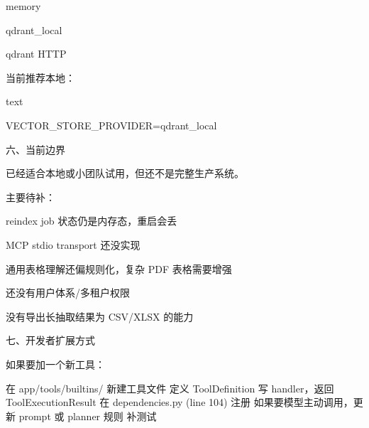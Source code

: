 memory

qdrant_local

qdrant HTTP


当前推荐本地：

text



VECTOR_STORE_PROVIDER=qdrant_local





六、当前边界

已经适合本地或小团队试用，但还不是完整生产系统。

主要待补：


reindex job 状态仍是内存态，重启会丢

MCP stdio transport 还没实现

通用表格理解还偏规则化，复杂 PDF 表格需要增强

还没有用户体系/多租户权限

没有导出长抽取结果为 CSV/XLSX 的能力


七、开发者扩展方式

如果要加一个新工具：

在 app/tools/builtins/ 新建工具文件
定义 ToolDefinition
写 handler，返回 ToolExecutionResult
在 dependencies.py (line 104) 注册
如果要模型主动调用，更新 prompt 或 planner 规则
补测试